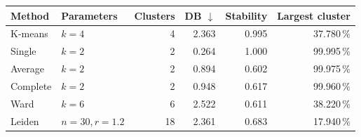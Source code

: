 \begin{tabular}{@{}llrrrr@{}}
\toprule
Method & Parameters & Clusters & DB $\downarrow$ & Stability & Largest cluster\\
\midrule
K-means & $k=4$ & 4 & 2.363 & 0.995 & 37.780\,\% \\
Single & $k=2$ & 2 & 0.264 & 1.000 & 99.995\,\% \\
Average & $k=2$ & 2 & 0.894 & 0.602 & 99.975\,\% \\
Complete & $k=2$ & 2 & 0.948 & 0.617 & 99.960\,\% \\
Ward & $k=6$ & 6 & 2.522 & 0.611 & 38.220\,\% \\
Leiden & $n=30, r=1.2$ & 18 & 2.361 & 0.683 & 17.940\,\% \\
\bottomrule
\end{tabular}
